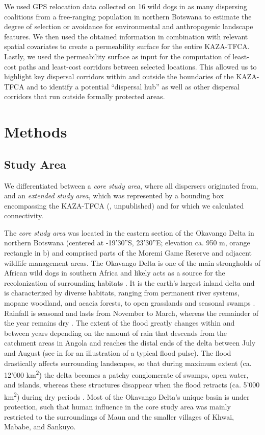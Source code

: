 \documentclass[abstract=on,10pt,a4paper,bibliography=totocnumbered]{scrartcl}
\begin{document}
We used GPS relocation data collected on 16 wild dogs in as many dispersing
coalitions from a free-ranging population in northern Botswana to estimate the
degree of selection or avoidance for environmental and anthropogenic landscape
features. We then used the obtained information in combination with relevant
spatial covariates to create a permeability surface for the entire KAZA-TFCA.
Lastly, we used the permeability surface as input for the computation of
least-cost paths and least-cost corridors between selected locations. This
allowed us to highlight key dispersal corridors within and outside the
boundaries of the KAZA-TFCA and to identify a potential ``dispersal hub'' as
well as other dispersal corridors that run outside formally protected areas.

\newpage
\section{Methods}
\subsection{Study Area}
We differentiated between a \textit{core study area}, where all dispersers
originated from, and an \textit{extended study area}, which was represented by a
bounding box encompassing the KAZA-TFCA (\citeauthor{Cozzi.2020}, unpublished)
and for which we calculated connectivity.

The \textit{core study area} was located in the eastern section of the Okavango
Delta in northern Botswana (centered at -19'30''S, 23'30''E;
elevation ca. 950 m, orange rectangle in b) and comprised parts
of the Moremi Game Reserve and adjacent wildlife management areas. The Okavango
Delta is one of the main strongholds of African wild dogs in southern Africa and
likely acts as a source for the recolonization of surrounding habitats
\citep{Woodroffe.2012, Cozzi.2013}. It is the earth's largest inland delta and
is characterized by diverse habitats, ranging from permanent river systems,
mopane woodland, and acacia forests, to open grasslands and seasonal swamps
\citep{Broekhuis.2013}. Rainfall is seasonal and lasts from November to March,
whereas the remainder of the year remains dry \citep{McNutt.1996}. The extent of
the flood greatly changes within and between years depending on the amount of
rain that descends from the catchment areas in Angola and reaches the distal
ends of the delta between July and August (see  in
 for an illustration of a typical flood
pulse). The flood drastically affects surrounding landscapes, so that during
maximum extent (ca. 12'000 km\textsuperscript{2}) the delta becomes a patchy
conglomerate of swamps, open water, and islands, whereas these structures
disappear when the flood retracts (ca. 5'000 km\textsuperscript{2}) during dry
periods \citep{Gumbricht.2004, Wolski.2017}. Most of the Okavango Delta's unique
basin is under protection, such that human influence in the core study area was
mainly restricted to the surroundings of Maun and the smaller villages of Khwai,
Mababe, and Sankuyo.
\end{document}
